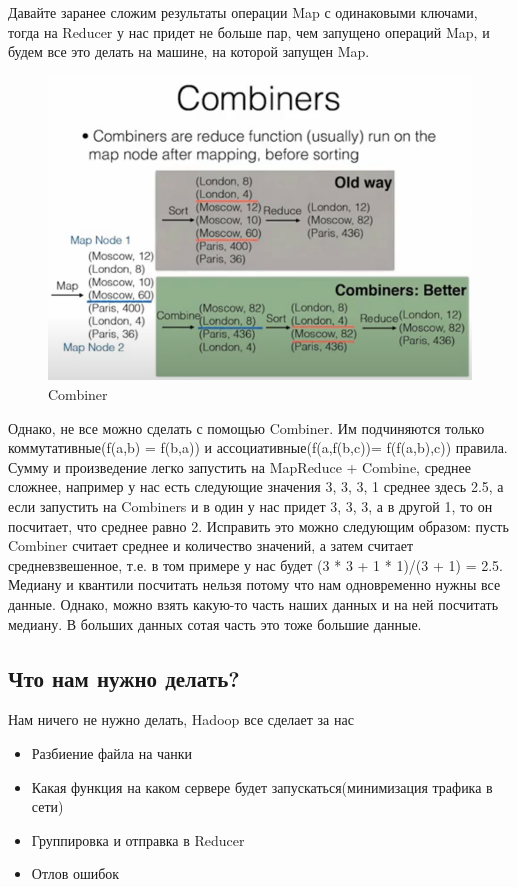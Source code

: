 \documentclass{article}
\begin{document}
Давайте заранее сложим результаты операции Map с одинаковыми ключами, тогда на Reducer у нас придет не больше пар, чем запущено операций Map, и будем все это делать на машине, на которой запущен Map.

\begin{figure}[h]
\centering
\includegraphics[width=1\textwidth]{Combiners.png}
\caption{Combiner}
\end{figure}

Однако, не все можно сделать с помощью Combiner. Им подчиняются только коммутативные(f(a,b) = f(b,a)) и ассоциативные(f(a,f(b,c))= f(f(a,b),c)) правила. Сумму и произведение легко запустить на MapReduce + Combine, среднее сложнее, например у нас есть следующие значения 3, 3, 3, 1 среднее здесь 2.5, а если запустить на Combiners и в один у нас придет 3, 3, 3, а в другой 1, то он посчитает, что среднее равно 2.
Исправить это можно следующим образом: пусть Combiner считает среднее и количество значений, а затем считает средневзвешенное, т.е. в том примере у нас будет (3 * 3 + 1 * 1)/(3 + 1) = 2.5. Медиану и квантили посчитать нельзя потому что нам одновременно нужны все данные. Однако, можно взять какую-то часть наших данных и на ней посчитать медиану. В больших данных сотая часть это тоже большие данные.

\subsection{Что нам нужно делать?}

Нам ничего не нужно делать, Hadoop все сделает за нас

\begin{itemize}
    \item Разбиение файла на чанки
    \item Какая функция на каком сервере будет запускаться(минимизация трафика в сети)
    \item Группировка и отправка в Reducer
    \item Отлов ошибок
\end{itemize}
\end{document}
